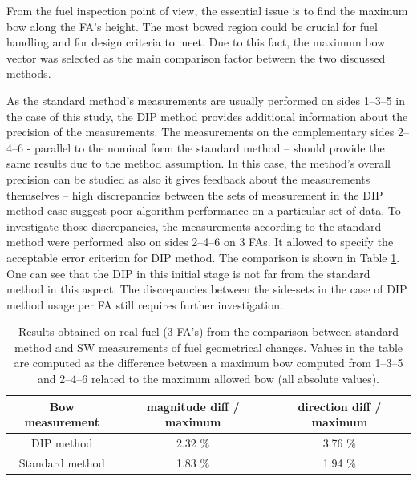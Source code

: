 \documentclass[preprint,12pt]{elsarticle}
\begin{document}
From the fuel inspection point of view, the essential issue is to find the maximum bow along the \ac{FA}’s height. The most bowed region could be crucial for fuel handling and for design criteria to meet. Due to this fact, the maximum bow vector was selected as the main comparison factor between the two discussed methods.

As the standard method’s measurements are usually performed on sides 1--3--5 in the case of this study, the \ac{DIP} method provides additional information about the precision of the measurements. The measurements on the complementary sides 2--4--6 - parallel to the nominal form the standard method – should provide the same results due to the method assumption. In this case, the method's overall precision can be studied as also it gives feedback about the measurements themselves – high discrepancies between the sets of measurement in the \ac{DIP} method case suggest poor algorithm performance on a particular set of data. To investigate those discrepancies, the measurements according to the standard method were performed also on sides 2--4--6 on 3 \ac{FA}s. It allowed to specify the acceptable error criterion for \ac{DIP} method. The comparison is shown in Table \ref{tab1}. One can see that the \ac{DIP} in this initial stage is not far from the standard method in this aspect. The discrepancies between the side-sets in the case of \ac{DIP} method usage per \ac{FA} still requires further investigation.

\begin{table}
\begin{tabular}{|c|c|c|}
\hline
Bow measurement & {magnitude diff / maximum} & {direction diff / maximum} \\ \hline
DIP method      & 2.32 \%             & 3.76 \%             \\ \hline
Standard method & 1.83 \%             & 1.94 \%             \\ \hline
\end{tabular}
\caption{
Results obtained on real fuel (3 FA's) from the comparison between standard method and \ac{SW} measurements of fuel geometrical changes. Values in the table are computed as the difference between a maximum bow computed from 1–3–5 and 2–4–6 related to the maximum allowed bow (all absolute values).}
\label{tab1}
\end{table}
\end{document}
